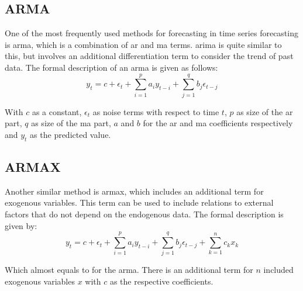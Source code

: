 \subsection{ARMA}

One of the most frequently used methods for forecasting in time series forecasting is \gls{arma}, which is a combination of \gls{ar} and \gls{ma} terms. \gls{arima} is quite similar to this, but involves an additional differentiation term to consider the trend of past data. The formal description of an \gls{arma} is given as follows:\\

\begin{equation}
y_t = c+\epsilon_t+\sum_{i=1}^{p}a_iy_{t-i}+\sum_{j=1}^{q}b_j\epsilon_{t-j}
\label{eq:arma}
\end{equation}

With $c$ as a constant, $\epsilon_t$ as noise terms with respect to time $t$, $p$ as size of the \gls{ar} part, $q$ as size of the \gls{ma} part, $a$ and $b$ for the \gls{ar} and \gls{ma} coefficients respectively and $y_t$ as the predicted value.\\

\subsection{ARMAX}

Another similar method is \gls{armax}, which includes an additional term for exogenous variables. This term can be used to include relations to external factors that do not depend on the endogenous data. The formal description is given by:\\

\begin{equation}
y_t = c+\epsilon_t+\sum_{i=1}^{p}a_iy_{t-i}+\sum_{j=1}^{q}b_j\epsilon_{t-j}+\sum_{k=1}^{n}c_kx_k
\label{eq:armax}
\end{equation}

Which almost equals to  for the \gls{arma}. There is an additional term for $n$ included exogenous variables $x$ with $c$ as the respective coefficients.

%

